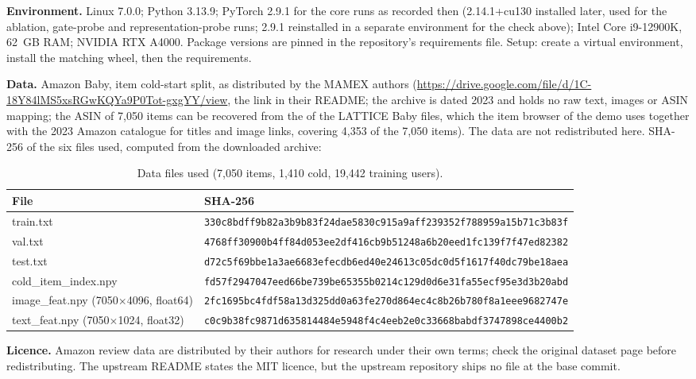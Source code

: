\documentclass[conference]{IEEEtran}
\newcommand{\code}[1]{\texttt{\detokenize{#1}}}
\begin{document}
\textbf{Environment.} Linux 7.0.0; Python 3.13.9; PyTorch 2.9.1 for the core runs as recorded then (2.14.1+cu130 installed later, used for the ablation, gate-probe and representation-probe runs; 2.9.1 reinstalled in a separate environment for the check above); Intel Core i9-12900K, 62~GB RAM; NVIDIA RTX A4000. Package versions are pinned in the repository's requirements file. Setup: create a virtual environment, install the matching \code{torch} wheel, then the requirements.

\textbf{Data.} Amazon Baby, item cold-start split, as distributed by the MAMEX authors (\url{https://drive.google.com/file/d/1C-18Y84lMS5xsRGwKQYa9P0Tot-gxgYY/view}, the link in their README; the archive is dated 2023 and holds no raw text, images or ASIN mapping; the ASIN of 7,050 items can be recovered from the \code{item\_list.txt} of the LATTICE Baby files, which the item browser of the demo uses together with the 2023 Amazon catalogue for titles and image links, covering 4,353 of the 7,050 items). The data are not redistributed here. SHA-256 of the six files used, computed from the downloaded archive:

\begin{table}[!t]
\centering\scriptsize
\caption{Data files used (7,050 items, 1,410 cold, 19,442 training users).}
\begin{tabular}{@{}ll@{}}
\toprule
File & SHA-256 \\
\midrule
train.txt & \texttt{330c8bdff9b82a3b9b83f24dae5830c915a9aff239352f788959a15b71c3b83f} \\
val.txt & \texttt{4768ff30900b4ff84d053ee2df416cb9b51248a6b20eed1fc139f7f47ed82382} \\
test.txt & \texttt{d72c5f69bbe1a3ae6683efecdb6ed40e24613c05dc0d5f1617f40dc79be18aea} \\
cold\_item\_index.npy & \texttt{fd57f2947047eed66be739be65355b0214c129d0d6e31fa55ecf95e3d3b20abd} \\
image\_feat.npy (7050$\times$4096, float64) & \texttt{2fc1695bc4fdf58a13d325dd0a63fe270d864ec4c8b26b780f8a1eee9682747e} \\
text\_feat.npy (7050$\times$1024, float32) & \texttt{c0c9b38fc9871d635814484e5948f4c4eeb2e0c33668babdf3747898ce4400b2} \\
\bottomrule
\end{tabular}
\end{table}

\textbf{Licence.} Amazon review data are distributed by their authors for research under their own terms; check the original dataset page before redistributing. The upstream README states the MIT licence, but the upstream repository ships no \code{LICENSE} file at the base commit.
\end{document}

